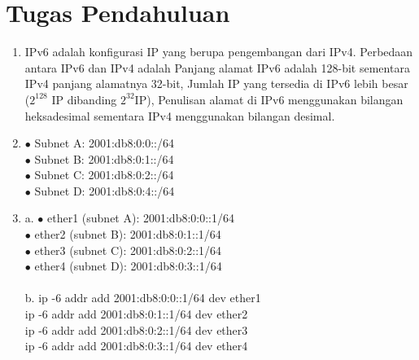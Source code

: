 \section{Tugas Pendahuluan}
\begin{enumerate}
	\item IPv6 adalah konfigurasi IP yang berupa pengembangan dari IPv4. Perbedaan antara IPv6 dan IPv4 adalah Panjang alamat IPv6 adalah 128-bit sementara IPv4 panjang alamatnya 32-bit, Jumlah IP yang tersedia di IPv6 lebih besar ($2^{128}$ IP dibanding $2^{32}$IP), Penulisan alamat di IPv6 menggunakan bilangan heksadesimal sementara IPv4 menggunakan bilangan desimal.
	\item $\bullet$ Subnet A: 2001:db8:0:0::/64\\
	$\bullet$ Subnet B: 2001:db8:0:1::/64\\
	$\bullet$ Subnet C: 2001:db8:0:2::/64\\
	$\bullet$ Subnet D: 2001:db8:0:4::/64\\
	\item a. $\bullet$ ether1 (subnet A): 2001:db8:0:0::1/64\\
	 $\bullet$ ether2 (subnet B): 2001:db8:0:1::1/64\\
	 $\bullet$ ether3 (subnet C): 2001:db8:0:2::1/64\\
	 $\bullet$ ether4 (subnet D): 2001:db8:0:3::1/64\\
	 \\
	 b. ip -6 addr add 2001:db8:0:0::1/64 dev ether1\\
	 ip -6 addr add 2001:db8:0:1::1/64 dev ether2\\
	 ip -6 addr add 2001:db8:0:2::1/64 dev ether3\\
	 ip -6 addr add 2001:db8:0:3::1/64 dev ether4
	

\end{enumerate}

